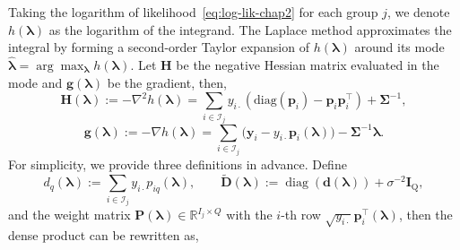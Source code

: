 Taking the logarithm of likelihood~\eqref{eq:log-lik-chap2} for each group $j$, we denote $h\left(\bm{\lambda}\right)$ as the logarithm of the integrand. The Laplace  method approximates the integral by forming a second-order Taylor expansion of $h\left(\bm{\lambda}\right)$ around its mode $\hat{\bm{\lambda}} = \arg\max_{\bm{\lambda}}h(\bm{\lambda})$.
Let $\mathbf{H}$ be the negative Hessian matrix evaluated in the mode and $\mathbf{g}\left(\bm{\lambda}\right)$ be the gradient, then, 
\begin{equation}
    \mathbf{H}(\bm{\lambda}):=-\nabla^{2}h(\bm{\lambda})=\sum_{i\in\mathcal{I}_{j}}y_{i\cdot}\left(\text{diag}(\bm{p}_{i})-\bm{p}_{i}\bm{p}_{i}^{\top}\right)+\bm{\Sigma}^{-1},
    \label{eq: hessian-equality}
\end{equation}
\begin{equation}
    \mathbf{g}\left(\bm{\lambda}\right):=-\nabla h\left(\bm{\lambda}\right)=\sum_{i\in \mathcal{I}_{j}}\bigl(\bm{y}_{i}-y_{i\cdot}\bm{p}_{i}(\bm{\lambda})\bigr)-\bm{\Sigma}^{-1}\bm{\lambda}.
    \label{eq:gradient}
\end{equation}
For simplicity, we provide three definitions in advance.
Define
\begin{equation*}
    d_{q}\left(\bm{\lambda}\right):=\sum_{i\in\mathcal{I}_{j}}y_{i\cdot}p_{iq}\left(\bm{\lambda}\right), \qquad \tilde{\mathbf{D}}\left(\bm{\lambda}\right):=\operatorname{diag}(\mathbf{d}\left(\bm{\lambda}\right))+\sigma^{-2}\mathbf{I}_{\text{Q}},
\end{equation*}
and the weight matrix $\mathbf{P}\left(\bm{\lambda}\right)\in \mathbb{R}^{I_{j}\times Q}$ with the $i$-th row $\sqrt{y_{i\cdot}}\bm{p}^{\top}_{i}\left(\bm{\lambda}\right)$, then the dense product can be rewritten as,
